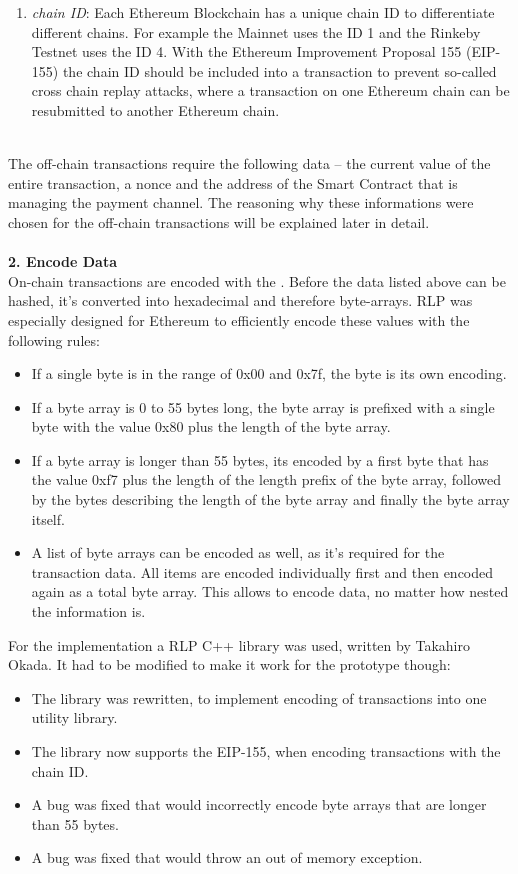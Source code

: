 \begin{enumerate}
  \item \textit{chain ID}: Each Ethereum Blockchain has a unique chain ID to differentiate different chains. For example the Mainnet uses the ID 1 and the Rinkeby Testnet uses the ID 4. With the Ethereum Improvement Proposal 155 (EIP-155)\cite{eip-155} the chain ID should be included into a transaction to prevent so-called cross chain replay attacks, where a transaction on one Ethereum chain can be resubmitted to another Ethereum chain.
\end{enumerate}
\leavevmode
\\
The off-chain transactions require the following data – the current value of the entire transaction, a nonce and the address of the Smart Contract that is managing the payment channel. The reasoning why these informations were chosen for the off-chain transactions will be explained later in detail.
\\\\
\textbf{2. Encode Data}\\
On-chain transactions are encoded with the \cite{ethereum-yellow-paper}. Before the data listed above can be hashed, it's converted into hexadecimal and therefore byte-arrays. RLP was especially designed for Ethereum to efficiently encode these values with the following rules: 
\begin{itemize}
  \item If a single byte is in the range of 0x00 and 0x7f, the byte is its own encoding.
  \item If a byte array is 0 to 55 bytes long, the byte array is prefixed with a single byte with the value 0x80 plus the length of the byte array.
  \item If a byte array is longer than 55 bytes, its encoded by a first byte that has the value 0xf7 plus the length of the length prefix of the byte array, followed by the bytes describing the length of the byte array and finally the byte array itself.
  \item A list of byte arrays can be encoded as well, as it's required for the transaction data. All items are encoded individually first and then encoded again as a total byte array. This allows to encode data, no matter how nested the information is.
\end{itemize}
For the implementation a RLP C++ library was used, written by Takahiro Okada\cite{rlp-lib}. It had to be modified to make it work for the prototype though:
\begin{itemize}
  \item The library was rewritten, to implement encoding of transactions into one utility library.
  \item The library now supports the EIP-155\cite{eip-155}, when encoding transactions with the chain ID.
  \item A bug was fixed that would incorrectly encode byte arrays that are longer than 55 bytes.
  \item A bug was fixed that would throw an out of memory exception. 
\end{itemize}

